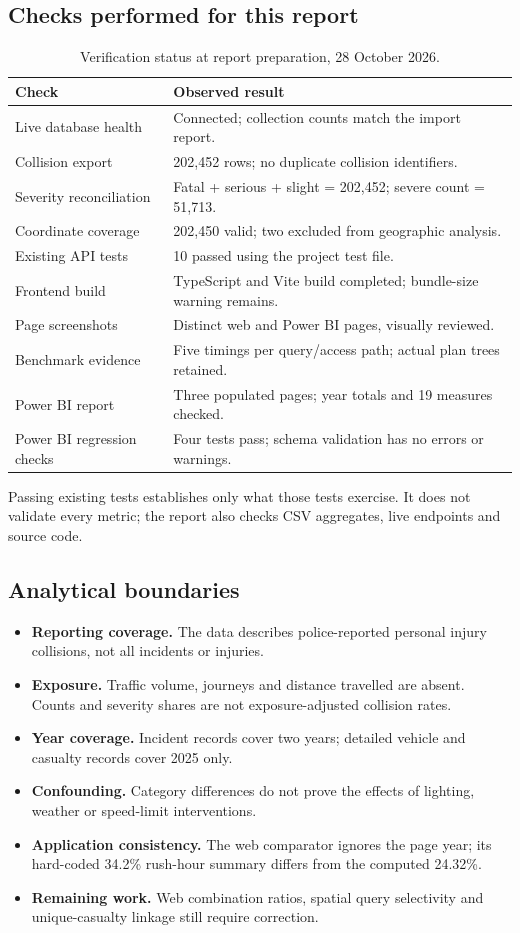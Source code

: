 \documentclass[11pt,a4paper]{article}
\begin{document}
\subsection{Checks performed for this report}
\begin{table}[H]
\caption{Verification status at report preparation, 28 October 2026.}
\begin{tabularx}{\textwidth}{L L}\toprule
\textbf{Check} & \textbf{Observed result} \\
\midrule
Live database health & Connected; collection counts match the import report. \\
Collision export & 202,452 rows; no duplicate collision identifiers. \\
Severity reconciliation & Fatal + serious + slight = 202,452; severe count = 51,713. \\
Coordinate coverage & 202,450 valid; two excluded from geographic analysis. \\
Existing API tests & 10 passed using the project test file. \\
Frontend build & TypeScript and Vite build completed; bundle-size warning remains. \\
Page screenshots & Distinct web and Power BI pages, visually reviewed. \\
Benchmark evidence & Five timings per query/access path; actual plan trees retained. \\
Power BI report & Three populated pages; year totals and 19 measures checked. \\
Power BI regression checks & Four tests pass; schema validation has no errors or warnings. \\
\bottomrule\end{tabularx}
\end{table}
Passing existing tests establishes only what those tests exercise. It does not validate every metric; the report also checks CSV aggregates, live endpoints and source code.
\subsection{Analytical boundaries}
\begin{itemize}
\item \textbf{Reporting coverage.} The data describes police-reported personal injury collisions, not all incidents or injuries.
\item \textbf{Exposure.} Traffic volume, journeys and distance travelled are absent. Counts and severity shares are not exposure-adjusted collision rates.
\item \textbf{Year coverage.} Incident records cover two years; detailed vehicle and casualty records cover 2025 only.
\item \textbf{Confounding.} Category differences do not prove the effects of lighting, weather or speed-limit interventions.
\item \textbf{Application consistency.} The web comparator ignores the page year; its hard-coded 34.2\% rush-hour summary differs from the computed 24.32\%.
\item \textbf{Remaining work.} Web combination ratios, spatial query selectivity and unique-casualty linkage still require correction.
\end{itemize}
\clearpage
\end{document}

